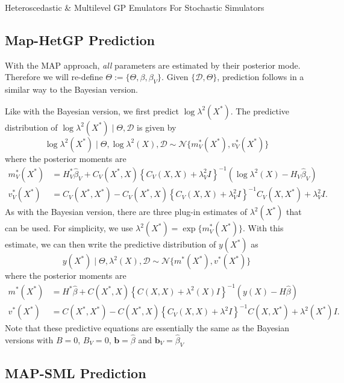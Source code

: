 \begin{chapter}{Heteroscedastic \& Multilevel GP Emulators For Stochastic Simulators\label{Ch:Hetsml}}
\subsection{Map-HetGP Prediction}

With the MAP approach, \emph{all} parameters are estimated by their posterior mode. Therefore we will re-define $\Theta := \{\Theta, \beta, \beta_V \}$. Given $\{\mathcal{D}, \Theta \}$, prediction follows in a similar way to the Bayesian version.

Like with the Bayesian version, we first predict $\log \lambda^2 (X^*)$. The predictive distribution of $\log \lambda^2 (X^*) \mid \Theta, \mathcal{D}$ is given by
\begin{equation}
	\log \lambda^2 (X^*) \mid \Theta, \log \lambda^2(X), \mathcal{D} \sim \mathcal{N} \{ m_V^*(X^*), v_V^*(X^*) \}
\end{equation}
where the posterior moments are
\begin{align}
	m_V^*(X^*) &= H_V^* \hat{\beta}_V + C_V(X^*, X)\left\{ C_V(X, X) + \lambda^2_V I \right\}^{-1} ( \log \lambda^2 (X) - H_V \hat{\beta}_V ) \\
	v_V^*(X^*) &= C_V(X^*, X^*) - C_V(X^*, X)\left\{ C_V(X, X) + \lambda^2_V I \right\}^{-1} C_V(X, X^*) + \lambda^2_V I.
\end{align}
As with the Bayesian version, there are three plug-in estimates of $\lambda^2(X^*)$ that can be used. For simplicity, we use $\lambda^2(X^*) = \exp\{ m_V^*(X^*) \}$. With this estimate, we can then write the predictive distribution of $y(X^*)$ as
\begin{equation}
	y(X^*) \mid \Theta,\lambda^2(X), \mathcal{D} \sim \mathcal{N} \{ m^*(X^*), v^*(X^*) \}
\end{equation}
where the posterior moments are
\begin{align}
	m^*(X^*) &= H^* \hat{\beta} + C(X^*, X)\left\{ C(X, X) + \lambda^2(X) I \right\}^{-1} ( y(X) - H \hat{\beta} ) \\
	v^*(X^*) &= C(X^*, X^*) - C(X^*, X)\left\{ C_V(X, X) + \lambda^2 I \right\}^{-1} C(X, X^*) + \lambda^2(X^*) I.
\end{align}
Note that these predictive equations are essentially the same as the Bayesian versions with $B = 0$, $B_V = 0$, $\bm{b} = \hat{\beta}$ and $\bm{b}_V = \hat{\beta}_V$
\subsection{MAP-SML Prediction}


\end{chapter}
